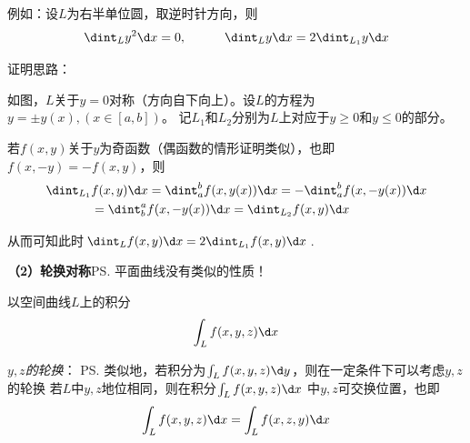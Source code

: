 例如：设$L$为右半单位圆，取逆时针方向，则
$$\dint_Ly^2\d x=0,\quad\quad\quad \dint_Ly\d x=2\dint_{L_1}y\d x$$

\begin{shaded}
	证明思路：
	
	\begin{center}
	\end{center}
	如图，$L$关于$y=0$对称（方向自下向上）。设$L$的方程为$y=\pm y(x),(x\in[a,b])$。
	记$L_1$和$L_2$分别为$L$上对应于$y\geq0$和$y\leq0$的部分。
	
	若$f(x,y)$关于$y$为奇函数（偶函数的情形证明类似），也即$f(x,-y)=-f(x,y)$，则
	\begin{align*}
		\dint_{L_1}&f(x,y)\d x
		=\dint_{a}^{b}f(x,y(x))\d x
		=-\dint_{a}^{b}f(x,-y(x))\d x\\
		&=\dint_{b}^{a}f(x,-y(x))\d x
		=\dint_{L_2}f(x,y)\d x
	\end{align*}
	
	从而可知此时$\dint_{L}f(x,y)\d x=2\dint_{L_1}f(x,y)\d x$.
\end{shaded}

{\bf （2）轮换对称}\ps{\color{red}平面曲线没有类似的性质！}

以空间曲线$L$上的积分
$$\int_Lf(x,y,z)\d x$$

{\it\color{red} $y,z$的轮换}：
\ps{类似地，若积分为$\int_Lf(x,y,z)\d y$，则在一定条件下可以考虑$y,z$的轮换}
{\color{red} 若$L$中$y,z$地位相同，则在积分$\int_Lf(x,y,z)\d x$
中$y,z$可交换位置}，也即
$$\int_Lf(x,y,z)\d x=\int_Lf(x,z,y)\d x$$

